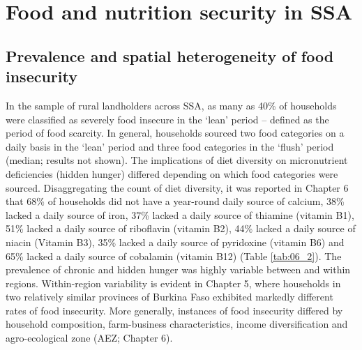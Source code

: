 \section{Food and nutrition security in SSA}
\subsection{Prevalence and spatial heterogeneity of food insecurity}
In the sample of rural landholders across SSA, as many as 40\% of households were classified as severely food insecure in the `lean' period -- defined as the period of food scarcity. In general, households sourced two food categories on a daily basis in the `lean' period and three food categories in the `flush' period (median; results not shown). The implications of diet diversity on micronutrient deficiencies (hidden hunger) differed depending on which food categories were sourced. Disaggregating the count of diet diversity, it was reported in Chapter 6 that 68\% of households did not have a year-round daily source of calcium, 38\% lacked a daily source of iron, 37\% lacked a daily source of thiamine (vitamin B1), 51\% lacked a daily source of riboflavin (vitamin B2), 44\% lacked a daily source of niacin (Vitamin B3), 35\% lacked a daily source of pyridoxine (vitamin B6) and 65\% lacked a daily source of cobalamin (vitamin B12) (Table \ref{tab:06_2}). The prevalence of chronic and hidden hunger was highly variable between and within regions. Within-region variability is evident in Chapter 5, where households in two relatively similar provinces of Burkina Faso exhibited markedly different rates of food insecurity. More generally, instances of food insecurity differed by household composition, farm-business characteristics, income diversification and agro-ecological zone (AEZ; Chapter 6).

